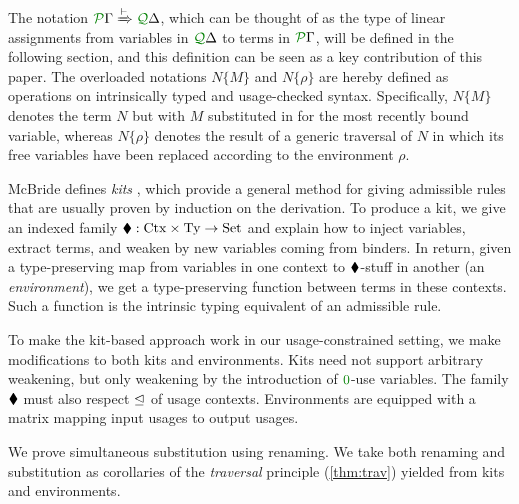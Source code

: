 \documentclass[submission,copyright,creativecommons]{eptcs}
\begin{document}

The notation $\ctx\Gamma P \subst\vdash \ctx\Delta Q$, which can be thought of
as the type of linear assignments from variables in $\ctx\Delta Q$ to terms in
$\ctx\Gamma P$, will be defined in the following section, and this definition
can be seen as a key contribution of this paper.
The overloaded notations $N\{M\}$ and $N\{\rho\}$ are hereby defined as
operations on intrinsically typed and usage-checked syntax.
Specifically, $N\{M\}$ denotes the term $N$ but with $M$ substituted in for the
most recently bound variable, whereas $N\{\rho\}$ denotes the result of a
generic traversal of $N$ in which its free variables have been replaced
according to the environment $\rho$.

McBride defines \emph{kits} \cite{rensub05,bhkm12}, which provide a general
method for giving admissible rules that are usually proven by induction on the
derivation.
To produce a kit, we give an indexed family
$\mathbin{\blacklozenge} : \mathrm{Ctx} \times \mathrm{Ty} \to \mathrm{Set}$ and explain how to
inject variables, extract terms, and weaken by new variables coming from
binders.
In return, given a type-preserving map from variables in one context to
$\mathbin{\blacklozenge}$-stuff in another (an \emph{environment}), we get a type-preserving
function between terms in these contexts.
Such a function is the intrinsic typing equivalent of an admissible rule.

To make the kit-based approach work in our usage-constrained setting, we make
modifications to both kits and environments.
Kits need not support arbitrary weakening, but only weakening by the
introduction of $\rescomment 0$-use variables.
The family $\mathbin{\blacklozenge}$ must also respect $\trianglelefteq$ of usage contexts.
Environments are equipped with a matrix mapping input usages to output usages.

We prove simultaneous substitution using renaming.
We take both renaming and substitution as corollaries of the \emph{traversal}
principle (\autoref{thm:trav}) yielded from kits and environments.
\end{document}
